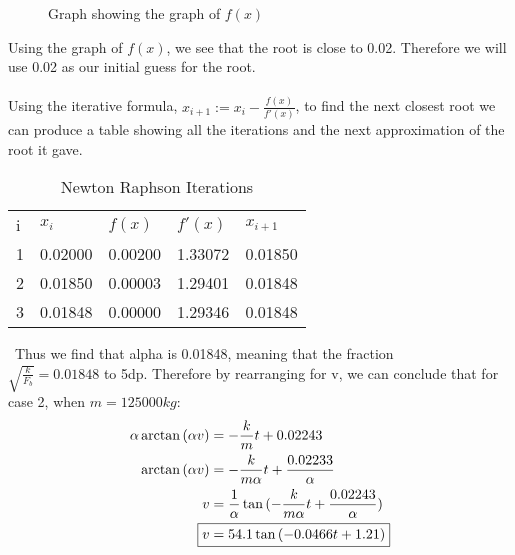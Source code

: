 \begin{figure}[H]
\centering

\caption{Graph showing the graph of $f(x)$}
\end{figure}

Using the graph of $f(x)$, we see that the root is close to 0.02. Therefore we will use 0.02 as our initial guess for the root.
\\ \\
Using the iterative formula, $x_{i+1} := x_{i}-\frac{f(x)}{f'(x)}$, to find the next closest root we can produce a table showing all the iterations and the next approximation of the root it gave.

\begin{table}[h]
\centering
    \begin{tabular}{|l|l|l|l|l|}
        \hline
        i & $x_i$ & $f(x)$ & $f'(x)$ & $x_{i+1}$ \\ \cline{1-5}
        1 & 0.02000 & 0.00200 & 1.33072 & 0.01850 \\ \cline{1-5}
        2 & 0.01850 & 0.00003 & 1.29401 & 0.01848 \\ \cline{1-5}
        3 & 0.01848 & 0.00000 & 1.29346 & 0.01848 \\ \cline{1-5}
    \end{tabular}
    \caption{Newton Raphson Iterations}
\end{table}
\
Thus we find that alpha is 0.01848, meaning that the fraction \\ $\sqrt{\frac{k}{F_b}} = 0.01848$ to 5dp.
\newline \newline
Therefore by rearranging for v, we can conclude that for case 2, when $m=125000kg$:
\begin{align*}
    \alpha \arctan{(\alpha v)} &= -\frac{k}{m}t + 0.02243
    \\ \arctan{(\alpha v)} &= -\frac{k}{m\alpha}t + \frac{0.02233}{\alpha}
    \\ v &= \frac{1}{\alpha} \tan{(-\frac{k}{m\alpha}t + \frac{0.02243}{\alpha})}
    \\ \Aboxed{v &=  54.1\tan{(-0.0466t + 1.21)}}
\end{align*}
